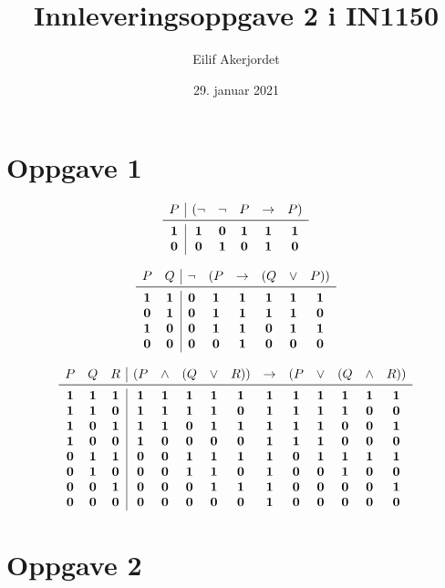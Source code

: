 \documentclass{in1150-innlevering}
\title{Innleveringsoppgave 2 i IN1150}
\author{Eilif Akerjordet}
\date{29. januar 2021}
\begin{document}
\maketitle

\section*{Oppgave 1}
\begin{deloppgaver}
    \item
      \[
        \begin{array}{c|ccccc}
          P&(\neg&\neg&P&\imp&P)\\\midrule
          \T&\T&\F&\T&\T&\T\\
          \F&\F&\T&\F&\T&\F
        \end{array}
      \]
    \item
      \[
        \begin{array}{cc|cccccc}
          P&Q&\neg&(P&\imp&(Q&\lor&P))\\\midrule
          \T&\T&\F&\T&\T&\T&\T&\T\\
          \F&\T&\F&\T&\T&\T&\T&\F\\
          \T&\F&\F&\T&\T&\F&\T&\T\\
          \F&\F&\F&\F&\T&\F&\F&\F
        \end{array}
      \]
    \item
      \[
        \begin{array}{ccc|ccccccccccc}
          P&Q&R&(P&\land&(Q&\lor&R))&\imp&(P&\lor&(Q&\land&R))\\\midrule
          \T&\T&\T&\T&\T&\T&\T&\T&\T&\T&\T&\T&\T&\T\\
          \T&\T&\F&\T&\T&\T&\T&\F&\T&\T&\T&\T&\F&\F\\
          \T&\F&\T&\T&\T&\F&\T&\T&\T&\T&\T&\F&\F&\T\\
          \T&\F&\F&\T&\F&\F&\F&\F&\T&\T&\T&\F&\F&\F\\
          \F&\T&\T&\F&\F&\T&\T&\T&\T&\F&\T&\T&\T&\T\\
          \F&\T&\F&\F&\F&\T&\T&\F&\T&\F&\F&\T&\F&\F\\
          \F&\F&\T&\F&\F&\F&\T&\T&\T&\F&\F&\F&\F&\T\\
          \F&\F&\F&\F&\F&\F&\F&\F&\T&\F&\F&\F&\F&\F
        \end{array}
      \]
\end{deloppgaver}
\section*{Oppgave 2}
\end{document}

